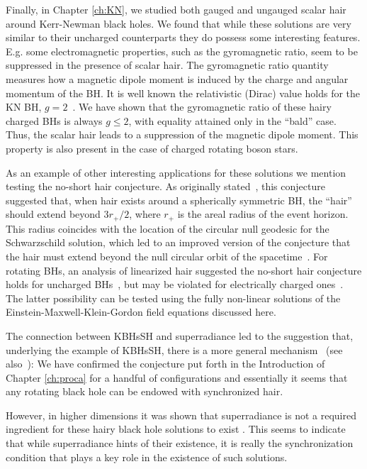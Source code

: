 \bigskip

Finally, in Chapter \ref{ch:KN}, we studied both gauged and ungauged scalar hair around Kerr-Newman black holes.
We found that while these solutions are very similar to their uncharged counterparts they do possess some interesting features.
E.g. some electromagnetic properties, such as the gyromagnetic ratio, seem to be suppressed in the presence of scalar hair.
The gyromagnetic ratio quantity measures how a magnetic dipole moment is induced by the charge and angular momentum of the BH.
It is well known the relativistic (Dirac) value holds for the KN BH, $g=2$~\cite{Carter:1968rr}.
We have shown that the gyromagnetic ratio of these hairy charged BHs is always $g\leqslant 2$, with equality attained only in the ``bald'' case.
Thus, the scalar hair leads to a suppression of the magnetic dipole moment.
This property is also present in the case of charged rotating boson stars.

As an example of other interesting applications for these solutions we mention testing the no-short hair conjecture.
As originally stated~\cite{Nunez:1996xv}, this conjecture suggested that, when hair exists around a spherically symmetric BH, the ``hair'' should extend beyond $3r_+/2$, where $r_+$ is the areal radius of the event horizon.
This radius coincides with the location of the circular null geodesic for the Schwarzschild solution, which led to an improved version of the conjecture that the hair must extend beyond the null circular orbit of the spacetime~\cite{Hod:2011aa}.
For rotating BHs, an analysis of linearized hair suggested the no-short hair conjecture holds for uncharged BHs~\cite{Hod:2016dkn}, but may be violated for electrically charged ones~\cite{Hod:2014sha,Hod:2015ynd}.
The latter possibility can be tested using the fully non-linear solutions of the Einstein-Maxwell-Klein-Gordon field equations discussed here. 

\bigskip

The connection between KBHsSH and superradiance led to the suggestion that, underlying the example of KBHsSH, there is a more general mechanism~\cite{Herdeiro:2014goa,Herdeiro:2014ima} (see also~\cite{Herdeiro:2015waa,Herdeiro:2015gia}): 
We have confirmed the conjecture put forth in the Introduction of Chapter \ref{ch:proca} for a handful of configurations and essentially it seems that any rotating black hole can be endowed with synchronized hair.

However, in higher dimensions it was shown that superradiance is not a required ingredient for these hairy black hole solutions to exist \cite{Brihaye:2014nba,Herdeiro:2015kha}.
This seems to indicate that while superradiance hints of their existence, it is really the synchronization condition that plays a key role in the existence of such solutions.

